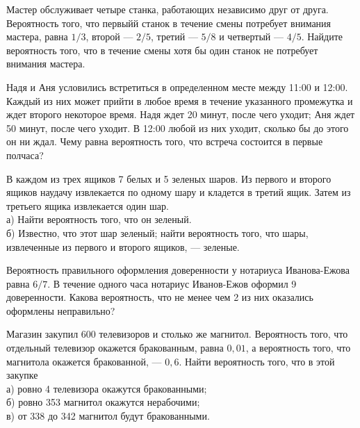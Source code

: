 \newpage\setcounter{zad}{0}



\begin{zkrW}{20}\noindent 
	Мастер обслуживает четыре станка, работающих независимо друг от друга. Вероятность того, что первыйй станок в течение смены потребует внимания мастера, равна $1/3$, второй --- $2/5$, третий --- $5/8$ и четвертый --- $4/5$. Найдите вероятность того, что в течение смены хотя бы один станок не потребует внимания мастера.
 
\end{zkrW}

\begin{zkrW}{20}\noindent 
	Надя и Аня условились встретиться в определенном месте между 11:00 и 12:00. Каждый из них может прийти в любое время в течение указанного промежутка и ждет второго некоторое время. Надя ждет 20 минут, после чего уходит; Аня ждет 50 минут, после чего уходит. В 12:00 любой из них уходит, сколько бы до этого он ни ждал. Чему равна вероятность того, что встреча состоится в первые полчаса?
 
\end{zkrW}

\begin{zkrW}{20}\noindent 
	В каждом из трех ящиков 7 белых и 5 зеленых шаров. Из первого и второго ящиков наудачу извлекается по одному шару и кладется в третий ящик. Затем из третьего ящика извлекается один шар. \\ \indent а) Найти вероятность того, что он зеленый. \\ \indent б) Известно, что этот шар зеленый; найти вероятность того, что шары, извлеченные из первого и второго ящиков, --- зеленые.
 
\end{zkrW}

\begin{zkrW}{20}\noindent 
	Вероятность правильного оформления доверенности у нотариуса Иванова-Ежова равна $6/7$. В течение одного часа нотариус Иванов-Ежов оформил 9 доверенности. Какова вероятность, что не менее чем 2 из них оказались оформлены неправильно?
 
\end{zkrW}

\begin{zkrW}{20}\noindent 
	Магазин закупил 600 телевизоров и столько же магнитол. Вероятность того, что отдельный телевизор окажется бракованным, равна $0{,}01$, а вероятность того, что магнитола окажется бракованной, --- $0{,}6$. Найти вероятность того, что в этой закупке \\ \indent а) ровно 4 телевизора окажутся бракованными; \\ \indent б) ровно 353 магнитол окажутся нерабочими; \\ \indent в) от 338 до 342 магнитол будут бракованными.
 
\end{zkrW}

